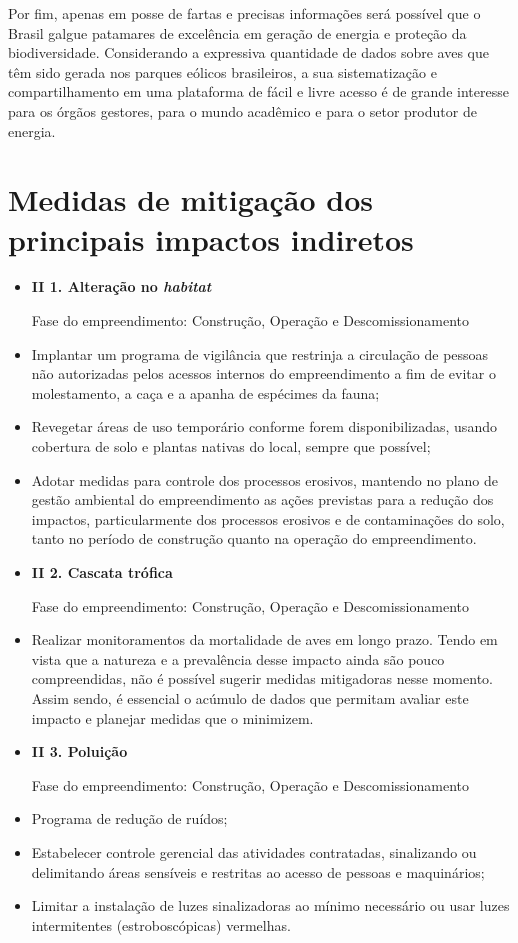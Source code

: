 \documentclass[
  oneside]{scrbook}
\begin{document}
Por fim, apenas em posse de fartas e precisas informações será possível que o Brasil galgue patamares de excelência em geração de energia e proteção da biodiversidade. Considerando a expressiva quantidade de dados sobre aves que têm sido gerada nos parques eólicos brasileiros, a sua sistematização e compartilhamento em uma plataforma de fácil e livre acesso é de grande interesse para os órgãos gestores, para o mundo acadêmico e para o setor produtor de energia.

\hypertarget{medidas-de-mitigauxe7uxe3o-dos-principais-impactos-indiretos}{%
\section{Medidas de mitigação dos principais impactos indiretos}\label{medidas-de-mitigauxe7uxe3o-dos-principais-impactos-indiretos}}

\begin{itemize}
\item
  \textbf{II 1. Alteração no \emph{habitat} }

  Fase do empreendimento: Construção, Operação e Descomissionamento
\item
  Implantar um programa de vigilância que restrinja a circulação de pessoas não autorizadas pelos acessos internos do empreendimento a fim de evitar o molestamento, a caça e a apanha de espécimes da fauna;
\item
  Revegetar áreas de uso temporário conforme forem disponibilizadas, usando cobertura de solo e plantas nativas do local, sempre que possível;
\item
  Adotar medidas para controle dos processos erosivos, mantendo no plano de gestão ambiental do empreendimento as ações previstas para a redução dos impactos, particularmente dos processos erosivos e de contaminações do solo, tanto no período de construção quanto na operação do empreendimento.
\item
  \textbf{II 2. Cascata trófica}

  Fase do empreendimento: Construção, Operação e Descomissionamento
\item
  Realizar monitoramentos da mortalidade de aves em longo prazo. Tendo em vista que a natureza e a prevalência desse impacto ainda são pouco compreendidas, não é possível sugerir medidas mitigadoras nesse momento. Assim sendo, é essencial o acúmulo de dados que permitam avaliar este impacto e planejar medidas que o minimizem.
\item
  \textbf{II 3. Poluição}

  Fase do empreendimento: Construção, Operação e Descomissionamento
\item
  Programa de redução de ruídos;
\item
  Estabelecer controle gerencial das atividades contratadas, sinalizando ou delimitando áreas sensíveis e restritas ao acesso de pessoas e maquinários;
\item
  Limitar a instalação de luzes sinalizadoras ao mínimo necessário ou usar luzes intermitentes (estroboscópicas) vermelhas.
\end{itemize}
\end{document}

